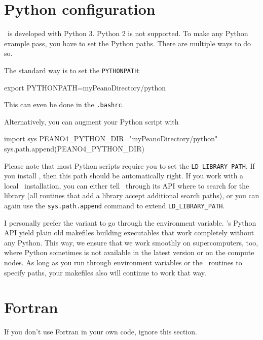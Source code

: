 \section{Python configuration}

\Peano\ is developed with Python 3. Python 2 is not supported. 
To make any Python example pass, you have to set the Python paths.
There are multiple ways to do so.

The standard way is to set the \texttt{PYTHONPATH}:
\begin{code}
export PYTHONPATH=myPeanoDirectory/python
\end{code}
This can even be done in the \texttt{.bashrc}.

Alternatively, you can augment your Python script with 
\begin{code}
import sys
PEANO4_PYTHON_DIR="myPeanoDirectory/python"
sys.path.append(PEANO4_PYTHON_DIR)
\end{code}


\noindent
Please note that most Python scripts require you to set the
\texttt{LD\_LIBRARY\_PATH}. 
If you install \Peano, then this path should be automatically right.
If you work with a local \Peano\ installation, you can either tell \Peano\
through its API where to search for the library (all routines that add a
library accept additional search paths), or you can again use the
\texttt{sys.path.append} command to extend \texttt{LD\_LIBRARY\_PATH}.


\begin{remark}
 I personally prefer the variant to go through the environment variable.
 \Peano's Python API yield plain old makefiles building executables that work
 completely without any Python. 
 This way, we ensure that we work smoothly on supercomputers, too, where Python
 sometimes is not available in the latest version or on the compute nodes.
 As long as you run through environment variables or the \Peano\ routines to
 specify paths, your makefiles also will continue to work that way. 
\end{remark}



\section{Fortran}

\begin{remark} 
 If you don't use Fortran in your own code, ignore this section.
\end{remark}

